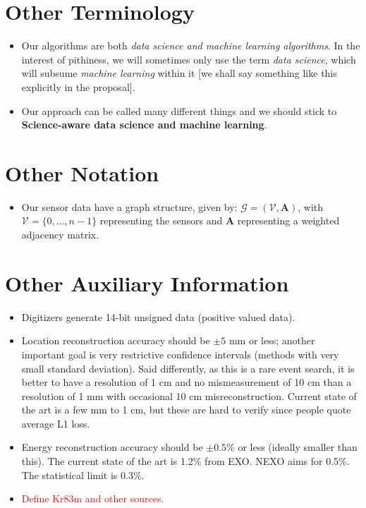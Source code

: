 \documentclass[]{article}
\providecommand{\tightlist}{%
  \setlength{\itemsep}{0pt}\setlength{\parskip}{0pt}}
\begin{document}
\section{Other Terminology}

\begin{itemize}
\tightlist
\item
  Our algorithms are both \emph{data science and machine learning algorithms}. In the interest of pithiness, we will sometimes only use the term \emph{data science}, which will subsume \emph{machine learning} within it {[}we shall say something like this explicitly in the proposal{]}.
\item
  Our approach can be called many different things and we should stick to \textbf{Science-aware data science and machine learning}.
 
  
\end{itemize}

\section{Other Notation}

\begin{itemize}
\tightlist
\item
  Our sensor data have a graph structure, given by: \(\mathcal{G} = (\mathcal{V}, \mathbf{A})\), with \(\mathcal{V} = \{0,\dots,n-1\}\) representing the sensors and \(\mathbf{A}\) representing a weighted adjacency matrix.
\end{itemize}


\section{Other Auxiliary Information}

\begin{itemize}
\tightlist
\item
  Digitizers generate 14-bit unsigned data (positive valued data).
\item
  Location reconstruction accuracy should be \(\pm 5\) mm or less; another important goal is very restrictive confidence intervals (methods with very small standard deviation).  Said differently, as this is a rare event search, it is better to have a resolution of 1 cm and no mismeasurement of 10 cm than a resolution of 1 mm with occasional 10 cm misreconstruction.  Current state of the art is a few mm to 1 cm, but these are hard to verify since people quote average L1 loss.
\item
  Energy reconstruction accuracy should be \(\pm 0.5\%\) or less (ideally smaller than this).  The current state of the art is 1.2\% from EXO.  NEXO aims for 0.5\%.  The statistical limit is 0.3\%.
  \item \textcolor{red}{Define Kr83m and other sources.}
\end{itemize}
\end{document}
